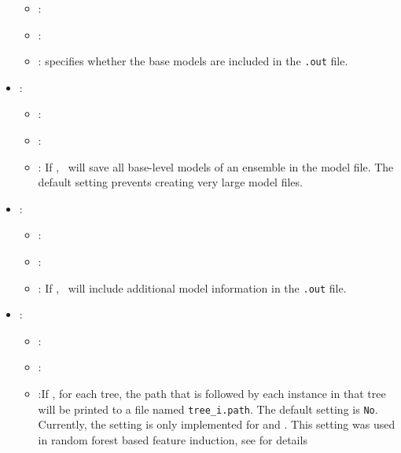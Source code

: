 \begin{itemize}
           \begin{itemize}
                \item \optionPossibleValues{}: 
                \item \optionDefaultValue{}: 
                \item \optionDescrption{}: specifies whether the base models are included in the \texttt{.out} file.
           \end{itemize}
    \item {}:
           \begin{itemize}
                \item \optionPossibleValues{}: 
                \item \optionDefaultValue{}: 
                \item \optionDescrption{}: If , \clus\ will save all base-level models of an ensemble in the model file. The default setting prevents creating very large model files.
           \end{itemize}
    \item {}:
           \begin{itemize}
                \item \optionPossibleValues{}: 
                \item \optionDefaultValue{}: 
                \item \optionDescrption{}: If , \clus\ will include additional model information in the \texttt{.out} file.
           \end{itemize}
    \item {}:
           \begin{itemize}
                \item \optionPossibleValues{}: 
                \item \optionDefaultValue{}: 
                \item \optionDescrption{}:If , for each tree, the path that is followed by each instance in that tree will be printed to a file named {\tt tree\_i.path}.  The default setting is \texttt{No}. Currently, the setting is only implemented for  and . This setting was used in random forest based feature induction, see \cite{Vens2011} for details

\end{itemize}
\end{itemize}
